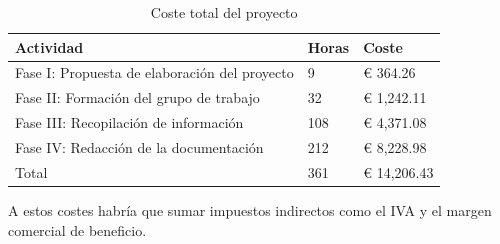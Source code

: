 \begin{table}[H]
    \centering
    \begin{tabular}{lll}
        \toprule
        Actividad                                       & Horas & Coste       \\
        \midrule
        Fase I: Propuesta de elaboración del   proyecto & 9     & € 364.26    \\
        Fase II: Formación del grupo de trabajo         & 32    & € 1,242.11  \\
        Fase III: Recopilación de información           & 108   & € 4,371.08  \\
        Fase IV: Redacción de la documentación          & 212   & € 8,228.98  \\
        \midrule
        Total                                           & 361   & € 14,206.43 \\
        \bottomrule
    \end{tabular}
    \caption{Coste total del proyecto}
    \label{tab:coste-total}
\end{table}

A estos costes habría que sumar impuestos indirectos como el IVA y el margen comercial de beneficio.